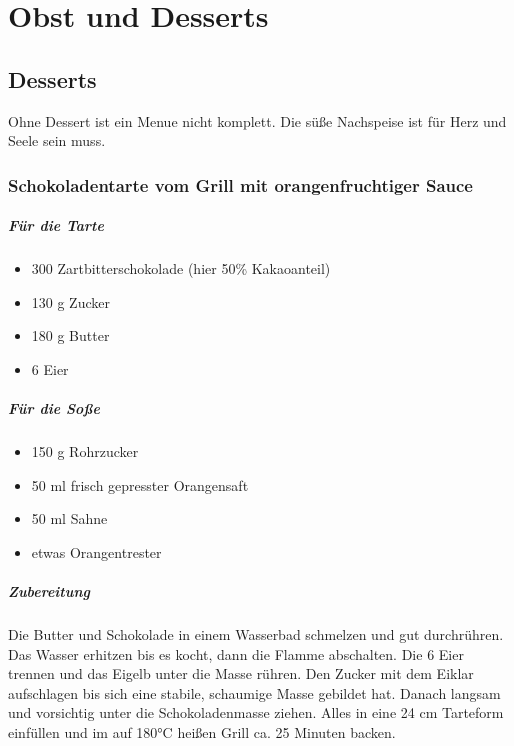 \chapter{Obst und Desserts}\label{Chapter8}

\section{Desserts}

Ohne Dessert ist ein Menue nicht komplett. Die süße Nachspeise ist für Herz 
und Seele sein muss.

\subsection{Schokoladentarte vom Grill mit orangenfruchtiger Sauce}

\paragraph{Für die Tarte}

\begin{itemize}[noitemsep]
	\item 300 Zartbitterschokolade (hier 50\% Kakaoanteil)
	\item 130 g Zucker
	\item 180 g Butter
	\item 6 Eier
\end{itemize}

\paragraph{Für die Soße}

\begin{itemize}[noitemsep]
	\item 150 g Rohrzucker
	\item 50 ml frisch gepresster Orangensaft
	\item 50 ml Sahne
	\item etwas Orangentrester
\end{itemize}

\paragraph{Zubereitung}

Die Butter und Schokolade in einem Wasserbad schmelzen und gut 
durchrühren. Das Wasser erhitzen bis es kocht, dann die Flamme abschalten. 
Die 6 Eier  trennen und das Eigelb unter die Masse rühren. Den Zucker mit dem 
Eiklar aufschlagen bis sich eine stabile, schaumige Masse gebildet hat. Danach 
langsam und vorsichtig unter die Schokoladenmasse ziehen. Alles in eine 24 
cm Tarteform einfüllen und im auf 180°C heißen Grill ca. 25 Minuten backen.

